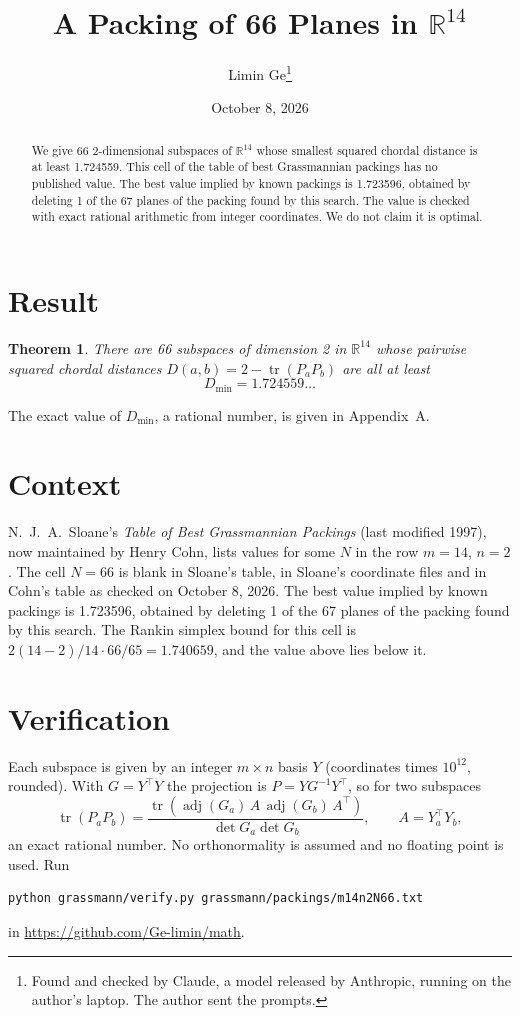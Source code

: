 \documentclass[11pt,a4paper]{article}
\title{A Packing of 66 Planes in $\mathbb{R}^{14}$}
\author{Limin Ge\thanks{Found and checked by Claude, a model released by Anthropic, running on the author's laptop. The author sent the prompts.}}
\date{October 8, 2026}
\newtheorem*{theorem}{Theorem}
\begin{document}
\maketitle
\begin{abstract}
We give 66 2-dimensional subspaces of $\mathbb{R}^{14}$ whose smallest squared chordal distance is at least 1.724559. This cell of the table of best Grassmannian packings has no published value. The best value implied by known packings is 1.723596, obtained by deleting 1 of the 67 planes of the packing found by this search. The value is checked with exact rational arithmetic from integer coordinates. We do not claim it is optimal.
\end{abstract}

\section{Result}
\begin{theorem}
There are 66 subspaces of dimension 2 in $\mathbb{R}^{14}$ whose pairwise squared chordal distances $D(a,b) = 2 - \operatorname{tr}(P_aP_b)$ are all at least
\[ D_{\min} = 1.724559\ldots \]
\end{theorem}
The exact value of $D_{\min}$, a rational number, is given in Appendix~A.


\section{Context}
N.~J.~A.~Sloane's \emph{Table of Best Grassmannian Packings} (last modified 1997), now maintained by Henry Cohn, lists values for some $N$ in the row $m=14$, $n=2$. The cell $N=66$ is blank in Sloane's table, in Sloane's coordinate files and in Cohn's table as checked on October 8, 2026. The best value implied by known packings is 1.723596, obtained by deleting 1 of the 67 planes of the packing found by this search. The Rankin simplex bound for this cell is $2(14-2)/14\cdot 66/65 = 1.740659$, and the value above lies below it.


\section{Verification}
Each subspace is given by an integer $m\times n$ basis $Y$ (coordinates times $10^{12}$, rounded). With $G=Y^\top Y$ the projection is $P=YG^{-1}Y^\top$, so for two subspaces
\[ \operatorname{tr}(P_aP_b)=\frac{\operatorname{tr}(\operatorname{adj}(G_a)\,A\,\operatorname{adj}(G_b)\,A^\top)}{\det G_a\det G_b},\qquad A=Y_a^\top Y_b, \]
an exact rational number. No orthonormality is assumed and no floating point is used. Run
\begin{verbatim}
python grassmann/verify.py grassmann/packings/m14n2N66.txt
\end{verbatim}
in \url{https://github.com/Ge-limin/math}.
\end{document}
